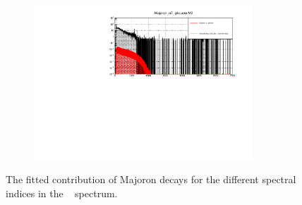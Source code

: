 \begin{figure}[htbp]
\begin{subfigure}[t]{0.8\linewidth}
\end{subfigure}
\qquad
\begin{subfigure}[t]{0.8\linewidth}
\includegraphics[width=0.9\textwidth]{Figures/Majoron_n7_g4cuore_M2.pdf}
\end{subfigure}
\caption[The fitted contribution of Majoron decays for the different spectral indices in the \Mtwo~ spectrum]{The fitted contribution of Majoron decays for the different spectral indices in the \Mtwo~ spectrum.}
\label{fig:SpectralIndicesM2Fit}
\end{figure}

